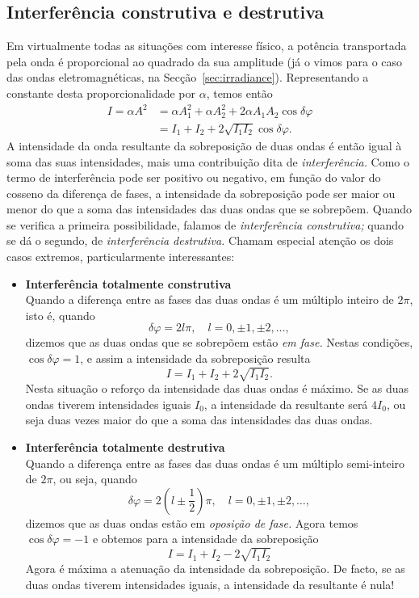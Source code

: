 \subsection{Interferência construtiva e destrutiva}
\label{sec:condint}
Em virtualmente todas as situações com interesse físico, a potência transportada
pela onda é proporcional ao quadrado da sua amplitude (já o vimos para o caso
das ondas eletromagnéticas, na Secção~\ref{sec:irradiance}). Representando a
constante desta proporcionalidade por $\alpha$, temos então
\begin{align}
I=\alpha A^2&=\alpha A_1^2+\alpha A_2^2 + 2\alpha A_1 A_2\cos\delta\varphi
\nonumber\\
&=I_1+I_2+2\sqrt{I_1I_2}\cos\delta\varphi.\label{eq:superp1}
\end{align}
A intensidade da onda resultante da sobreposição de duas ondas é então igual à
soma das suas intensidades, mais uma contribuição dita de \emph{interferência.}
Como o termo de interferência pode ser positivo ou negativo, em função do valor
do cosseno da diferença de fases, a intensidade da sobreposição pode ser maior
ou menor do que a soma das intensidades das duas ondas que se sobrepõem.  Quando
se verifica a primeira possibilidade, falamos de \emph{interferência
construtiva;} quando se dá o segundo, de \emph{interferência destrutiva.}
Chamam especial atenção os dois casos extremos, particularmente interessantes:
\begin{itemize}
\item \textbf{Interferência totalmente construtiva}\\
Quando a diferença entre as fases das duas ondas é um múltiplo inteiro de $2\pi$,
isto é, quando
\begin{equation*}
\delta\varphi = 2l\pi,\quad l=0,\pm1,\pm2,\ldots,
\end{equation*}
dizemos que as duas ondas que se sobrepõem estão \emph{em fase.} Nestas
condições, $\cos\delta\varphi=1$, e assim a intensidade da sobreposição resulta
\begin{equation*}
I=I_1 + I_2+2\sqrt{I_1I_2}.
\end{equation*}
Nesta situação o reforço da intensidade das duas ondas é máximo. Se as duas ondas
tiverem intensidades iguais $I_0$, a intensidade da resultante será $4I_0$, ou
seja duas vezes maior do que a soma das intensidades das duas ondas.
\item \textbf{Interferência totalmente destrutiva}\\
Quando a diferença entre as fases das duas ondas é um múltiplo semi-inteiro de
$2\pi$, ou seja, quando
\begin{equation*}
\delta\varphi = 2\left(l\pm\frac{1}{2}\right)\pi,\quad l=0,\pm1,\pm2,\ldots,
\end{equation*}
dizemos que as duas ondas estão em \emph{oposição de fase.} Agora temos
$\cos\delta\varphi=-1$ e obtemos para a intensidade da sobreposição
\begin{equation*}
I=I_1 + I_2 - 2\sqrt{I_1I_2}
\end{equation*}
Agora é máxima a atenuação da intensidade da sobreposição. De facto, se as duas
ondas tiverem intensidades iguais, a intensidade da resultante é nula!
\end{itemize}

